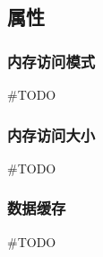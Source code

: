 \subsection{属性}

\subsubsection{内存访问模式}
\#TODO

\subsubsection{内存访问大小}
\#TODO

\subsubsection{数据缓存}
\#TODO
